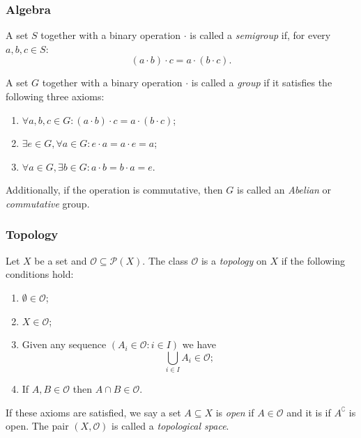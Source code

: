 \subsubsection{Algebra}
\begin{definition}
	A set $S$ together with a binary operation $\cdot$ is called a \textit{semigroup} if, for every $a, b, c \in S$:
	\[
	(a \cdot b) \cdot c = a \cdot (b \cdot c).
	\]
\end{definition}

\begin{definition}
	A set $G$ together with a binary operation $\cdot$ is called a \textit{group} if it satisfies the following three axioms:
	\begin{enumerate}
		\item  $\forall a, b, c \in G: (a \cdot b) \cdot c = a \cdot (b \cdot c)$;
		\item $\exists e \in G, \forall a \in G:  e \cdot a = a \cdot e = a$;
		\item $\forall a \in G, \exists b \in G: a \cdot b = b \cdot a = e$.
	\end{enumerate}
Additionally, if the operation is commutative, then $G$ is called an \textit{Abelian} or \textit{commutative} group.
\end{definition}



\subsubsection{Topology}

\begin{definition}
	Let $X$ be a set and $\mathcal{O} \subseteq \mathcal{P}(X)$. The class $\mathcal{O}$ is a \textit{topology} on $X$ if the following conditions hold:
	\begin{enumerate}
		\item $\emptyset \in \mathcal{O}$;
		\item $X \in \mathcal{O}$;
		\item  Given any sequence $(A_i \in \mathcal{O} : i \in I)$ we have 
		\[
		\bigcup_{i \in I} A_i  \in \mathcal{O};
		\]
		\item If $A, B \in \mathcal{O}$ then $A \cap B \in \mathcal{O}$.
	\end{enumerate}
If these axioms are satisfied, we say a set $A \subseteq X$ is \textit{open} if $A \in \mathcal{O}$ and it is  if $A^\complement$ is open. The pair $(X, \mathcal{O})$ is called a \textit{topological space}.
\end{definition}


